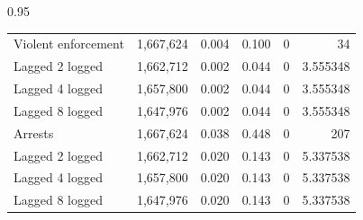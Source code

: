 \documentclass[12pt,letterpaper]{article}
\begin{document}
\begin{table}[h!]
\begin{spacing}{0.95}
\begin{tabular}{lrrrrr}
	Violent enforcement	&	 1,667,624 	&	0.004	&	0.100	&	0	&	34	 \\
	\hspace{1em} Lagged 2 logged	&	 1,662,712 	&	0.002	&	0.044	&	0	&	3.555348	 \\
	\hspace{1em} Lagged 4 logged	&	 1,657,800 	&	0.002	&	0.044	&	0	&	3.555348	 \\
	\hspace{1em} Lagged 8 logged	&	 1,647,976 	&	0.002	&	0.044	&	0	&	3.555348	 \\
												
												
	Arrests	&	 1,667,624 	&	0.038	&	0.448	&	0	&	207	 \\
	\hspace{1em} Lagged 2 logged	&	 1,662,712 	&	0.020	&	0.143	&	0	&	5.337538	 \\
	\hspace{1em} Lagged 4 logged	&	 1,657,800 	&	0.020	&	0.143	&	0	&	5.337538	 \\
	\hspace{1em} Lagged 8 logged	&	 1,647,976 	&	0.020	&	0.143	&	0	&	5.337538	 \\
												

\end{tabular}
\end{spacing}
\end{table}
\end{document}
